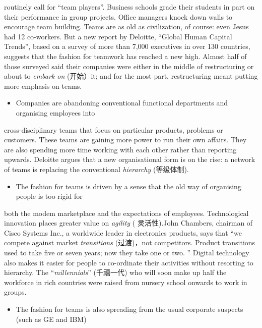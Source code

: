 \documentclass[UTF8,11pt]{ctexart}
\begin{document}
routinely call for “team players”. Business schools grade their students in part on their performance in group projects. Office managers knock down walls to encourage team building. Teams are as old as civilization, of course: even Jesus had 12 co-workers. But a new report by Deloitte, “Global Human Capital Trends”, based on a survey of more than 7,000 executives in over 130 countries, suggests that the fashion for teamwork has reached a new high. Almost half of those surveyed said their companies were either in the middle of restructuring or about to\textit{ embark on} (开始）it; and for the most part, restructuring meant putting more emphasis on teams.


\begin{itemize}[leftmargin=2em,itemsep=.2em,topsep=.4em]\item[B.] Companies are abandoning conventional functional departments and organising employees into
\end{itemize}

cross-disciplinary teams that focus on particular products, problems or customers. These teams are gaining more power to run their own affairs. They are also spending more time working with each other rather than reporting upwards. Deloitte argues that a new organisational form is on the rise: a network of teams is replacing the conventional\textit{ hierarchy} (等级体制).


\begin{itemize}[leftmargin=2em,itemsep=.2em,topsep=.4em]\item[C.] The fashion for teams is driven by a sense that the old way of organising people is too rigid for
\end{itemize}

both the modem marketplace and the expectations of employees. Technological innovation places greater value on\textit{ agility} ( 灵活性).John Chambers, chairman of Cisco Systems Inc., a worldwide leader in electronics products, says that “we compete against market\textit{ transitions} (过渡)，not competitors. Product transitions used to take five or seven years; now they take one or two. ” Digital technology also makes it easier for people to co-ordinate their activities without resorting to hierarchy. The “\textit{millennials}” (千禧一代) who will soon make up half the workforce in rich countries were raised from nursery school onwards to work in groups.


\begin{itemize}[leftmargin=2em,itemsep=.2em,topsep=.4em]\item[D.] The fashion for teams is also spreading from the usual corporate suspects (such as GE and IBM)
\end{itemize}
\end{document}

